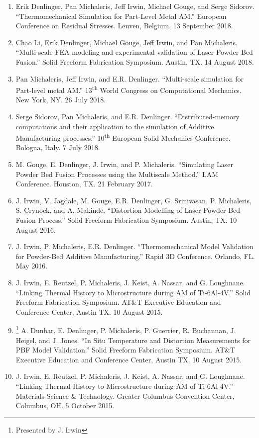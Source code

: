 \documentclass[10.5pt,letterpaper]{article}
\begin{document}
\begin{enumerate}[leftmargin=*]
	\item Erik Denlinger, Pan Michaleris, Jeff Irwin, Michael Gouge, and Serge Sidorov.  ``Thermomechanical Simulation for Part-Level Metal AM.''  European Conference on Residual Stresses.  Leuven, Belgium.  13 September 2018.
	\item Chao Li, Erik Denlinger, Michael Gouge, Jeff Irwin, and Pan Michaleris.  ``Multi-scale FEA modeling and experimental validation of Laser Powder Bed Fusion.'' Solid Freeform Fabrication Symposium.  Austin, TX. 14 August 2018.
	\item Pan Michaleris, Jeff Irwin, and E.R. Denlinger.  ``Multi-scale simulation for Part-level metal AM.''  13\textsuperscript{th} World Congress on Computational Mechanics.  New York, NY.  26 July 2018.
	\item Serge Sidorov, Pan Michaleris, and E.R. Denlinger.  ``Distributed-memory computations and their application to the simulation of Additive Manufacturing processes.''  10\textsuperscript{th} European Solid Mechanics Conference.  Bologna, Italy.  7 July 2018.
	\item M. Gouge, E. Denlinger, J. Irwin, and P. Michaleris.  ``Simulating Laser Powder Bed Fusion Processes using the Multiscale Method.''  LAM Conference.  Houston, TX.  21 February 2017.
	\item J. Irwin, V. Jagdale, M. Gouge, E.R. Denlinger, G. Srinivasan, P. Michaleris, S. Crynock, and A. Makinde.  ``Distortion Modelling of Laser Powder Bed Fusion Process.''  Solid Freeform Fabrication Symposium.  Austin, TX.  10 August 2016.
	\item J. Irwin, P. Michaleris, E.R. Denlinger.  ``Thermomechanical Model Validation for Powder-Bed Additive Manufacturing.''  Rapid 3D Conference.  Orlando, FL.  May 2016.
	\item J. Irwin, E. Reutzel, P. Michaleris, J. Keist, A. Nassar, and G. Loughnane. ``Linking Thermal History to Microstructure during AM of Ti-6Al-4V.'' Solid Freeform Fabrication Symposium. AT\&T Executive Education and Conference Center, Austin TX. 10 August 2015.
	\item \footnote{\label{note1}Presented by J. Irwin} A. Dunbar, E. Denlinger, P. Michaleris, P. Guerrier, R. Buchannan, J. Heigel, and J. Jones. ``In Situ Temperature and Distortion Measurements for PBF Model Validation.'' Solid Freeform Fabrication Symposium. AT\&T Executive Education and Conference Center, Austin TX. 10 August 2015.
	\item J. Irwin, E. Reutzel, P. Michaleris, J. Keist, A. Nassar, and G. Loughnane. ``Linking Thermal History to Microstructure during AM of Ti-6Al-4V.'' Materials Science \& Technology. Greater Columbus Convention Center, Columbus, OH. 5 October 2015.

\end{enumerate}
\end{document}
